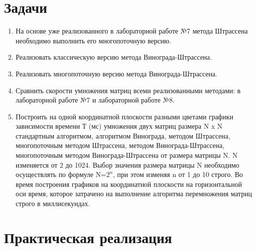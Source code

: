 \documentclass[a4paper, 14pt]{extarticle}
\begin{document}
\section{Задачи}\label{Sect::task}
\par
\renewcommand{\labelenumii}{\arabic{enumi}.\arabic{enumii}.}
\begin{enumerate} 
    \item На основе уже реализованного в лабораторной работе №7 метода Штрассена необходимо выполнить его многопоточную версию.
    \item Реализовать классическую версию метода Винограда-Штрассена.
    \item Реализовать многопоточную версию метода Винограда-Штрассена.
    \item Сравнить скорости умножения матриц всеми реализованными методами: в лабораторной работе №7 и лабораторной работе №8.
    \item Построить на одной координатной плоскости разными цветами графики зависимости времени Т (мс) умножения двух матриц размера N x N стандартным алгоритмом, алгоритмом Винограда, методом Штрассена, многопоточным методом Штрассена, методом Винограда-Штрассена, многопоточным методом Винограда-Штрассена от размера матрицы N. N изменяется от 2 до 1024. Выбор значения размера матрицы N необходимо осуществлять по формуле N=$2^n$, при этом изменяя n от 1 до 10 строго. Во время построения графиков на координатной плоскости на горизонтальной оси время, которое затрачено на выполнение алгоритма перемножения матриц строго в миллисекундах.
\end{enumerate}

\pagebreak
\section{Практическая реализация}
\end{document}
